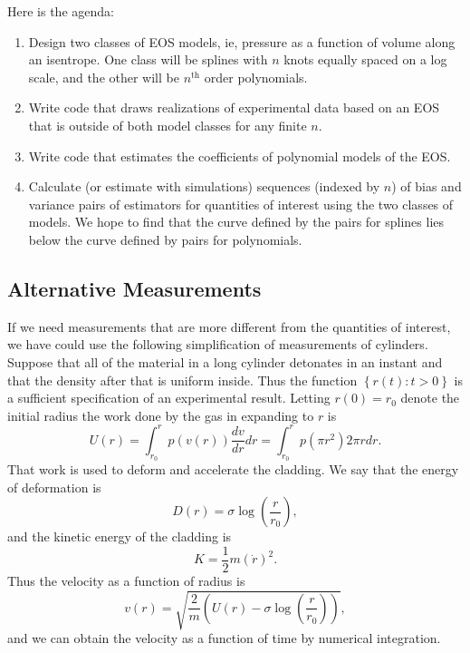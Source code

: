 \documentclass[11pt]{article}
\begin{document}
Here is the agenda:
\begin{enumerate}
\item Design two classes of EOS models, ie, pressure as a function of
  volume along an isentrope.  One class will be splines with $n$ knots
  equally spaced on a log scale, and the other will be $n^{\text{th}}$
  order polynomials.
\item Write code that draws realizations of experimental data based on
  an EOS that is outside of both model classes for any finite $n$.
\item Write code that estimates the coefficients of polynomial models
  of the EOS.
\item Calculate (or estimate with simulations) sequences (indexed by
  $n$) of bias and variance pairs of estimators for quantities of
  interest using the two classes of models.  We hope to find that the
  curve defined by the pairs for splines lies below the curve defined
  by pairs for polynomials.
\end{enumerate}

\subsection{Alternative Measurements}
\label{sec:alternative}

If we need measurements that are more different from the quantities of
interest, we have could use the following simplification of
measurements of cylinders.  Suppose that all of the material in a long
cylinder detonates in an instant and that the density after that is
uniform inside.  Thus the function $\left\{r(t): t>0 \right\}$ is a
sufficient specification of an experimental result.  Letting
$r(0) = r_0$ denote the initial radius the work done by the gas in
expanding to $r$ is
\begin{equation*}
  U(r) = \int_{r_0}^r p(v(r)) \frac{dv}{dr} dr = \int_{r_0}^r p(\pi
  r^2) 2\pi r dr.
\end{equation*}
That work is used to deform and accelerate the cladding.  We say that
the energy of deformation is
\begin{equation*}
  D(r) = \sigma \log \left(\frac{r}{r_0} \right),
\end{equation*}
and the kinetic energy of the cladding is
\begin{equation*}
  K = \frac{1}{2} m \left( \dot r \right)^2.
\end{equation*}
Thus the velocity as a function of radius is
\begin{equation*}
  v(r) = \sqrt{\frac{2}{m} \left( U(r) - \sigma \log
      \left(\frac{r}{r_0} \right) \right) },
\end{equation*}
and we can obtain the velocity as a function of time by numerical
integration.
\end{document}
